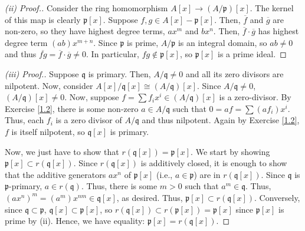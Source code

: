 \begin{proof}[(ii) Proof.]
Consider the ring homomorphism $A[x] \to (A/\mathfrak{p})[x]$. The kernel of this map is clearly $\mathfrak{p}[x]$. Suppose $f,g \in A[x] - \mathfrak{p}[x]$. Then, $\overline{f}$ and $\overline{g}$ are
non-zero, so they have highest degree terms, $ax^m$ and $bx^n$. Then, $\overline{f} \cdot \overline{g}$ has highest degree term $(ab)x^{m+n}$. Since $\mathfrak{p}$ is prime, $A/\mathfrak{p}$ is an integral
domain, so $ab \neq 0$ and thus $\overline{fg} = \overline{f} \cdot \overline{g} \neq 0$. In particular, $fg \not\in \mathfrak{p}[x]$, so $\mathfrak{p}[x]$ is a prime ideal.
\end{proof}

\begin{proof}[(iii) Proof.]
Suppose $\mathfrak{q}$ is primary. Then, $A/\mathfrak{q} \neq 0$ and all its zero divisors are nilpotent. Now, consider $A[x]/\mathfrak{q}[x] \cong (A/\mathfrak{q})[x]$. Since $A/\mathfrak{q} \neq 0$, 
$(A/\mathfrak{q})[x] \neq 0$. Now, suppose $f = \sum f_ix^i \in (A/\mathfrak{q})[x]$ is a zero-divisor. By Exercise \ref{1.2}, there is some non-zero $a \in A/\mathfrak{q}$ such that $0 = af = \sum (af_i)x^i$. Thus,
each $f_i$ is a zero divisor of $A/\mathfrak{q}$ and thus nilpotent. Again by Exercise \ref{1.2}, $f$ is itself nilpotent, so $\mathfrak{q}[x]$ is primary.

Now, we just have to show that $r(\mathfrak{q}[x]) = \mathfrak{p}[x]$. We start by showing $\mathfrak{p}[x] \subset r(\mathfrak{q}[x])$. Since $r(\mathfrak{q}[x])$ is additively closed, it is enough to show that the
additive generators $ax^n$ of $\mathfrak{p}[x]$ (i.e., $a \in \mathfrak{p}$) are in $r(\mathfrak{q}[x])$. Since $\mathfrak{q}$ is $\mathfrak{p}$-primary, $a \in r(\mathfrak{q})$. Thus, there is some $m > 0$ such that
$a^m \in \mathfrak{q}$. Thus, $(ax^n)^m = (a^m)x^{nm} \in \mathfrak{q}[x]$, as desired. Thus, $\mathfrak{p}[x] \subset r(\mathfrak{q}[x])$. Conversely, since $\mathfrak{q} \subset \mathfrak{p}$, 
$\mathfrak{q}[x] \subset \mathfrak{p}[x]$, so $r(\mathfrak{q}[x]) \subset r(\mathfrak{p}[x]) = \mathfrak{p}[x]$ since $\mathfrak{p}[x]$ is prime by (ii). Hence, we have equality: $\mathfrak{p}[x] = r(\mathfrak{q}[x])$.
\end{proof}

